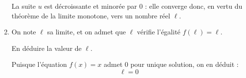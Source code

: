\documentclass[12pt]{cornouaille}
\begin{document}
\begin{exercice}
\begin{enumerate}
\begin{solution}
La suite $u$ est décroissante et minorée par $0$ : elle converge donc, en vertu du théorème de la limite monotone, vers un nombre réel $\ell$.
\end{solution}
\item On note $\ell$ sa limite, et on admet que $\ell$ vérifie l'égalité $f(\ell) = \ell$.

En déduire la valeur de $\ell$.

\begin{solution}
Puisque l'équation $f(x) = x$ admet $0$ pour unique solution, on en déduit :
	\[ \ell = 0\]	
\end{solution}
\end{enumerate}
\end{exercice}

\newpage
\end{document}
